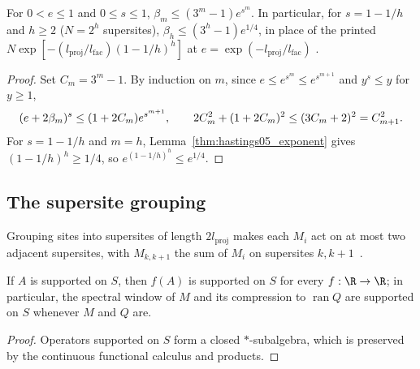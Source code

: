 \begin{lemma}
    \label{thm:hastings05_hierarchy_closed_form}
    \leanok
    For $0<e\le1$ and $0\le s\le1$, $\beta_m\le(3^m-1)e^{s^m}$. In particular,
    for $s=1-1/h$ and $h\ge2$ ($N=2^h$ supersites),
    $\beta_h\le(3^h-1)e^{1/4}$, in place of the printed
    $N\exp[-(l_{\mathrm{proj}}/l_{\mathrm{fac}})(1-1/h)^h]$ at
    $e=\exp(-l_{\mathrm{proj}}/l_{\mathrm{fac}})$
    \cite[lines 705--707]{Hastings2006Solving}.
\end{lemma}
\begin{proof}\leanok
    Set $C_m=3^m-1$. By induction on $m$, since $e\le e^{s^m}\le e^{s^{m+1}}$
    and $y^s\le y$ for $y\ge1$,
    \begin{align}
        (e+2\beta_m)^s\le(1+2C_m)e^{s^{m+1}},\qquad
        2C_m^2+(1+2C_m)^2\le(3C_m+2)^2=C_{m+1}^2.
        \notag
    \end{align}
    For $s=1-1/h$ and $m=h$, Lemma~\ref{thm:hastings05_exponent} gives
    $(1-1/h)^h\ge1/4$, so $e^{(1-1/h)^h}\le e^{1/4}$.
\end{proof}

\subsection{The supersite grouping}

Grouping sites into supersites of length $2l_{\mathrm{proj}}$ makes each $M_i$
act on at most two adjacent supersites, with $M_{k,k+1}$ the sum of $M_i$ on
supersites $k,k+1$~\cite[lines 609--628]{Hastings2006Solving}.

\begin{lemma}
    \label{thm:hastings05_window_support}
    \leanok
    If $A$ is supported on $S$, then $f(A)$ is supported on $S$ for every
    $f:\R\to\R$; in particular, the spectral window of $M$ and its compression
    to $\operatorname{ran}Q$ are supported on $S$ whenever $M$ and $Q$ are.
\end{lemma}
\begin{proof}\leanok
    Operators supported on $S$ form a closed $*$-subalgebra, which is preserved
    by the continuous functional calculus and products.
\end{proof}

